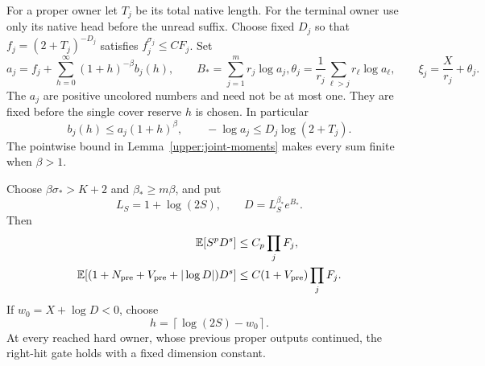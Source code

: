 For a proper owner let $T_j$ be its total native length.  For the
terminal owner use only its native head before the unread suffix.
Choose fixed $D_j$ so that $f_j=(2+T_j)^{-D_j}$ satisfies
$f_j^{\sigma_j}\leq CF_j$.  Set
\begin{equation}
 a_j=f_j+\sum_{h=0}^\infty(1+h)^{-\beta}b_j(h),\qquad
 B_* =\sum_{j=1}^m r_j\log a_j,
 \theta_j=\frac1{r_j}\sum_{\ell>j}r_\ell\log a_\ell,
 \qquad \xi_j=\frac X{r_j}+\theta_j.
 \label{upper:pooling}
\end{equation}
The $a_j$ are positive uncolored numbers and need not be at most one.
They are fixed before the single cover reserve $h$ is chosen.  In
particular
\begin{equation}
 b_j(h)\leq a_j(1+h)^\beta,
 \qquad-\log a_j\leq D_j\log(2+T_j).
 \label{upper:pool-bounds}
\end{equation}
The pointwise bound in Lemma~\ref{upper:joint-moments} makes every
sum finite when $\beta>1$.

\begin{lemma}
\label{upper:pool-gate}
Choose $\beta\sigma_*>K+2$ and $\beta_*\geq m\beta$, and put
\begin{equation}
 L_S=1+\log(2S),\qquad D=L_S^{\beta_*}e^{B_*}.
 \label{upper:global-cost}
\end{equation}
Then
\begin{align}
 \mathbb E[S^pD^s]&\leq C_p\prod_jF_j,\notag\\
 \mathbb E[(1+N_{\rm pre}+V_{\rm pre}+|\log D|)D^s]
                    &\leq C(1+V_{\rm pre})\prod_jF_j.
 \label{upper:pooled-moments}
\end{align}
If $w_0=X+\log D<0$, choose
\begin{equation}
 h=\left\lceil\log(2S)-w_0\right\rceil.
 \label{upper:global-h}
\end{equation}
At every reached hard owner, whose previous proper outputs continued,
the right-hit gate holds with a fixed dimension constant.
\end{lemma}

